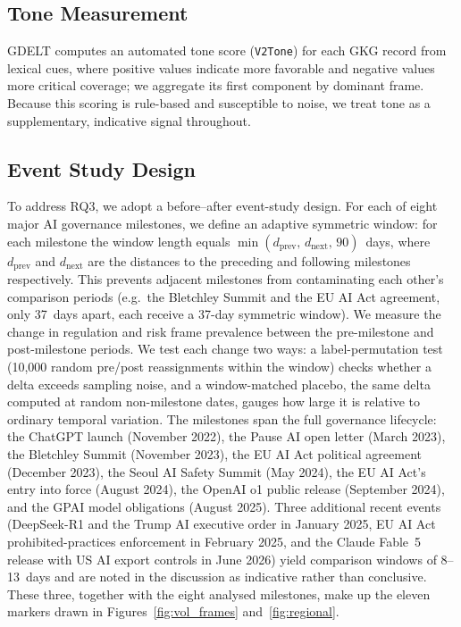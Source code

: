 \documentclass[sigconf]{acmart}
\begin{document}
\subsection{Tone Measurement}

GDELT computes an automated tone score (\texttt{V2Tone}) for each GKG record from lexical cues, where positive values indicate more favorable and negative values more critical coverage; we aggregate its first component by dominant frame.
Because this scoring is rule-based and susceptible to noise, we treat tone as a supplementary, indicative signal throughout.

\subsection{Event Study Design}
\label{sec:eventdesign}

To address RQ3, we adopt a before--after event-study design.
For each of eight major AI governance milestones, we define an adaptive symmetric window: for each milestone the window length equals $\min(d_{\mathrm{prev}},\, d_{\mathrm{next}},\, 90)$~days, where $d_{\mathrm{prev}}$ and $d_{\mathrm{next}}$ are the distances to the preceding and following milestones respectively.
This prevents adjacent milestones from contaminating each other's comparison periods (e.g.\ the Bletchley Summit and the EU AI Act agreement, only 37~days apart, each receive a 37-day symmetric window).
We measure the change in regulation and risk frame prevalence between the pre-milestone and post-milestone periods.
We test each change two ways: a label-permutation test (10{,}000 random pre/post reassignments within the window) checks whether a delta exceeds sampling noise, and a window-matched placebo, the same delta computed at random non-milestone dates, gauges how large it is relative to ordinary temporal variation.
The milestones span the full governance lifecycle: the ChatGPT launch (November 2022), the Pause AI open letter (March 2023), the Bletchley Summit (November 2023), the EU AI Act political agreement (December 2023), the Seoul AI Safety Summit (May 2024), the EU AI Act's entry into force (August 2024), the OpenAI o1 public release (September 2024), and the GPAI model obligations (August 2025).
Three additional recent events (DeepSeek-R1 and the Trump AI executive order in January 2025, EU AI Act prohibited-practices enforcement in February 2025, and the Claude Fable~5 release with US AI export controls in June 2026) yield comparison windows of 8--13~days and are noted in the discussion as indicative rather than conclusive. These three, together with the eight analysed milestones, make up the eleven markers drawn in Figures~\ref{fig:vol_frames} and~\ref{fig:regional}.
\end{document}
